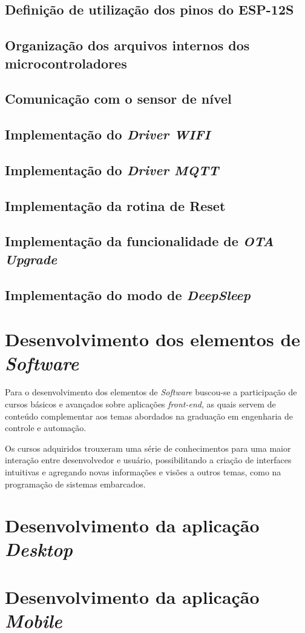 \subsection {Definição de utilização dos pinos do ESP-12S}
\subsection{Organização dos arquivos internos dos microcontroladores}
\subsection{Comunicação com o sensor de nível}
\subsection {Implementação do \textit{Driver WIFI}}
\subsection {Implementação do \textit{Driver MQTT}}
\subsection{Implementação da rotina de Reset}
\subsection{Implementação da funcionalidade de \textit{OTA Upgrade}}
\subsection{Implementação do modo de \textit{DeepSleep}}


\section{Desenvolvimento dos elementos de \textit{Software}}


Para o desenvolvimento dos elementos de \textit{Software} buscou-se a participação de cursos básicos e avançados sobre aplicações \textit{front-end}, as quais servem de conteúdo complementar aos temas abordados na graduação em engenharia de controle e automação.

Os cursos adquiridos trouxeram uma série de conhecimentos para uma maior interação entre desenvolvedor e usuário, possibilitando a criação de interfaces intuitivas e agregando novas informações e visões a outros temas, como na programação de sistemas embarcados.

\section{Desenvolvimento da aplicação \textit{Desktop}}
\section{Desenvolvimento da aplicação \textit{Mobile}}